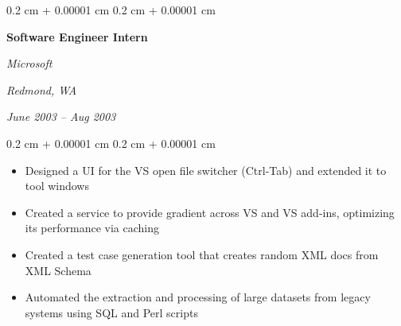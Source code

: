 \documentclass[10pt,letterpaper]{article}%
\newenvironment{highlights}{
    \begin{itemize}[
        topsep=0.10 cm,
        parsep=0.10 cm,
        partopsep=0pt,
        itemsep=0pt,
        leftmargin=0.4 cm + 10pt
    ]
}{
    \end{itemize}
} %
\newenvironment{onecolentry}{
    \begin{adjustwidth}{
        0.2 cm + 0.00001 cm
    }{
        0.2 cm + 0.00001 cm
    }
}{
    \end{adjustwidth}
} %
\newenvironment{twocolentry}[2][]{
    \onecolentry
    \def\secondColumn{#2}
    \setcolumnwidth{\fill, 4.5 cm}
    \begin{paracol}{2}
}{
    \switchcolumn \raggedleft \secondColumn
    \end{paracol}
    \endonecolentry
} %
\begin{document}
    \vspace{0.2 cm}

    \begin{twocolentry}{
        \textit{Redmond, WA}
        
        \textit{June 2003 – Aug 2003}
    }
        \textbf{Software Engineer Intern}
        
        \textit{Microsoft}
    \end{twocolentry}

    \vspace{0.10 cm}

    \begin{onecolentry}
        \begin{highlights}
        \item Designed a UI for the VS open file switcher (Ctrl-Tab) and extended it to tool windows %
        \item Created a service to provide gradient across VS and VS add-ins, optimizing its performance via caching %
        \item Created a test case generation tool that creates random XML docs from XML Schema %
        \item Automated the extraction and processing of large datasets from legacy systems using SQL and Perl scripts %

        \end{highlights}
    \end{onecolentry}

    \vspace{0.2 cm}
\end{document}
